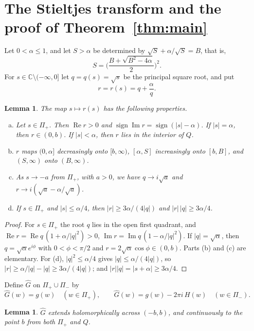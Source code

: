 \documentclass[11pt]{amsart}
\numberwithin{equation}{section}
\newtheorem{lemma}[theorem]{Lemma}
\theoremstyle{definition}
\theoremstyle{remark}
\newcommand{\C}{\mathbb{C}}
\newcommand{\Pim}{\Pi_{-}}
\newcommand{\Pip}{\Pi_{+}}
\DeclareMathOperator{\re}{Re}
\DeclareMathOperator{\im}{Im}
\begin{document}
\section{The Stieltjes transform and the proof of Theorem~\ref{thm:main}}\label{sec:proof}

Let $0<\alpha\le1$, and let $S>\alpha$ be determined by
$\sqrt S+\alpha/\sqrt S=B$, that is,
\begin{equation}\label{eq:S}
S=\biggl(\frac{B+\sqrt{B^2-4\alpha}}{2}\biggr)^2 .
\end{equation}
For $s\in\C\setminus(-\infty,0]$ let $q=q(s)=\sqrt s$ be the principal square
root, and put
\[
r=r(s)=q+\frac{\alpha}{q} .
\]

\begin{lemma}\label{lem:geometry}
The map $s\mapsto r(s)$ has the following properties.
\begin{enumerate}[(a)]
\item Let $s\in\Pip$. Then $\re r>0$ and
$\operatorname{sign}\im r=\operatorname{sign}(|s|-\alpha)$. If $|s|=\alpha$,
then $r\in(0,b)$. If $|s|<\alpha$, then $r$ lies in the interior of $Q$.
\item $r$ maps $(0,\alpha]$ decreasingly onto $[b,\infty)$, $[\alpha,S]$
increasingly onto $[b,B]$, and $(S,\infty)$ onto $(B,\infty)$.
\item As $s\to-a$ from $\Pip$, with $a>0$, we have $q\to i\sqrt a$ and
$r\to i(\sqrt a-\alpha/\sqrt a)$.
\item If $s\in\Pip$ and $|s|\le\alpha/4$, then $|r|\ge3\alpha/(4|q|)$ and
$|r|\,|q|\ge3\alpha/4$.
\end{enumerate}
\end{lemma}

\begin{proof}
For $s\in\Pip$ the root $q$ lies in the open first quadrant, and
$\re r=\re q\,(1+\alpha/|q|^2)>0$, $\im r=\im q\,(1-\alpha/|q|^2)$. If
$|q|=\sqrt\alpha$, then $q=\sqrt\alpha e^{i\phi}$ with $0<\phi<\pi/2$ and
$r=2\sqrt\alpha\cos\phi\in(0,b)$. Parts (b) and (c) are elementary. For (d),
$|q|^2\le\alpha/4$ gives $|q|\le\alpha/(4|q|)$, so
$|r|\ge\alpha/|q|-|q|\ge3\alpha/(4|q|)$; and $|r||q|=|s+\alpha|\ge3\alpha/4$.
\end{proof}

Define $\widehat G$ on $\Pip\cup\Pim$ by
\[
\widehat G(w)=g(w)\quad(w\in\Pip),\qquad
\widehat G(w)=g(w)-2\pi i\,H(w)\quad(w\in\Pim).
\]

\begin{lemma}\label{lem:Ghat}
$\widehat G$ extends holomorphically across $(-b,b)$, and continuously to the
point $b$ from both $\Pip$ and $Q$.
\end{lemma}
\end{document}
